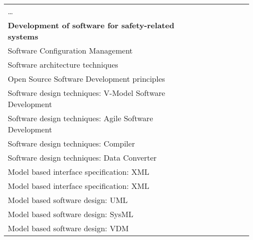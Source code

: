\documentclass[a4paper, 11pt]{article}
\begin{document}
\begin{center}
\begin{longtable}{|r|r|r|r|r|r|r|r|}
    \hline
    \multicolumn{1}{|l|}{…} & \multicolumn{1}{c|}{} &       &       &       &       &       &  \bigstrut[t]\\
    \multicolumn{1}{|l|}{\textbf{Development of software for safety-related systems}} & \multicolumn{1}{l|}{\textbf{}} &       &       &       &       &       &  \\
    \multicolumn{1}{|l|}{Software Configuration Management} & \multicolumn{1}{l|}{} &       &       &       &       &       &  \bigstrut[b]\\
    \hline
    \multicolumn{1}{|l|}{Software architecture techniques} & \multicolumn{1}{l|}{} &       &       &       &       &       &  \bigstrut\\
    \hline
    \multicolumn{1}{|l|}{Open Source Software Development principles} & \multicolumn{1}{l|}{} &       &       &       &       &       &  \bigstrut\\
    \hline
    \multicolumn{1}{|l|}{Software design techniques: V-Model Software Development} & \multicolumn{1}{l|}{} &       &       &       &       &       &  \bigstrut\\
    \hline
    \multicolumn{1}{|l|}{Software design techniques: Agile Software Development} & \multicolumn{1}{l|}{} &       &       &       &       &       &  \bigstrut\\
    \hline
    \multicolumn{1}{|l|}{Software design techniques: Compiler} & \multicolumn{1}{l|}{} &       &       &       &       &       &  \bigstrut\\
    \hline
    \multicolumn{1}{|l|}{Software design techniques: Data Converter} & \multicolumn{1}{l|}{} &       &       &       &       &       &  \bigstrut\\
    \hline
    \multicolumn{1}{|l|}{Model based interface specification: XML} & \multicolumn{1}{l|}{} &       &       &       &       &       &  \bigstrut\\
    \hline
    \multicolumn{1}{|l|}{Model based interface specification: XML} & \multicolumn{1}{l|}{} &       &       &       &       &       &  \bigstrut\\
    \hline
    \multicolumn{1}{|l|}{Model based software design: UML} & \multicolumn{1}{l|}{} &       &       &       &       &       &  \bigstrut\\
    \hline
    \multicolumn{1}{|l|}{Model based software design: SysML} & \multicolumn{1}{l|}{} &       &       &       &       &       &  \bigstrut\\
    \hline
    \multicolumn{1}{|l|}{Model based software design: VDM} & \multicolumn{1}{l|}{} &       &       &       &       &       &  \bigstrut\\

\end{longtable}
\end{center}
\end{document}
